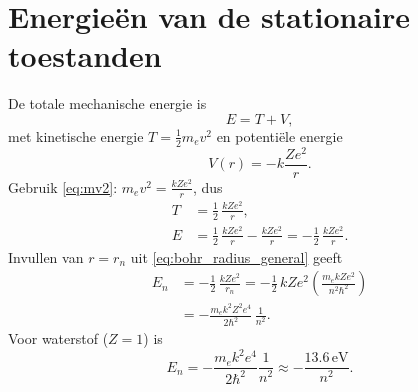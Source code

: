 \documentclass{report} %
\begin{document}
    \section{Energieën van de stationaire toestanden}
    De totale mechanische energie is
    \[
        E = T + V,
    \]
    met kinetische energie $T=\frac12 m_e v^2$ en potenti\"ele energie
    \[
        V(r) = -k\frac{Z e^2}{r}.
    \]
    Gebruik \eqref{eq:mv2}: $m_e v^2 = \frac{k Z e^2}{r}$, dus
    \begin{align}
        T &= \frac12\,\frac{k Z e^2}{r},
        \\
        E &= \frac12\,\frac{k Z e^2}{r} - \frac{k Z e^2}{r}
        = -\frac12\,\frac{k Z e^2}{r}.
        \label{eq:E_vs_r}
    \end{align}
    Invullen van $r=r_n$ uit \eqref{eq:bohr_radius_general} geeft
    \begin{align}
        E_n
        &= -\frac12\,\frac{k Z e^2}{r_n}
        = -\frac12\,k Z e^2\left(\frac{m_e k Z e^2}{n^2\hbar^2}\right)
        \\
        &= -\frac{m_e k^2 Z^2 e^4}{2\hbar^2}\,\frac{1}{n^2}.
        \label{eq:bohr_energy_general}
    \end{align}
    Voor waterstof ($Z=1$) is
    \[
        E_n = -\frac{m_e k^2 e^4}{2\hbar^2}\frac{1}{n^2}
        \approx -\frac{13.6\,\mathrm{eV}}{n^2}.
    \]
\end{document}
